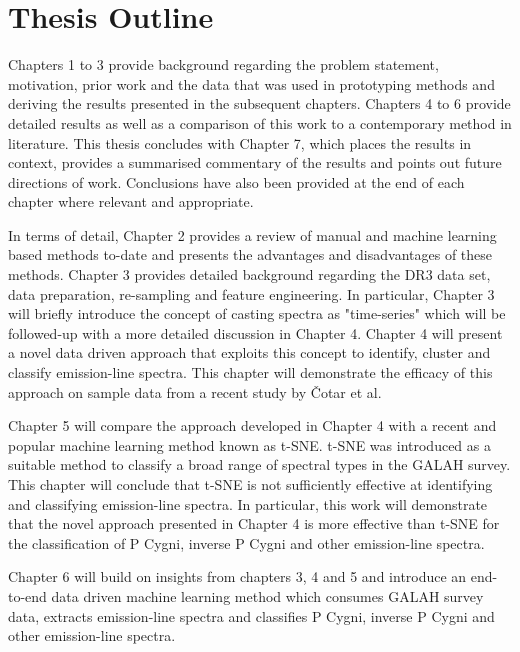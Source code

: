 \section{Thesis Outline}

Chapters 1 to 3 provide background regarding the problem statement, motivation, prior work and the data that was used in prototyping methods and deriving the results presented in the subsequent chapters. Chapters 4 to 6 provide detailed results as well as a comparison of this work to a contemporary method in literature. This thesis concludes with Chapter 7, which places the results in context, provides a summarised commentary of the results and points out future directions of work. Conclusions have also been provided at the end of each chapter where relevant and appropriate. 

In terms of detail, Chapter 2 provides a review of manual and machine learning based methods to-date and presents the advantages and disadvantages of these methods. Chapter 3 provides detailed background regarding the DR3 data set, data preparation, re-sampling and feature engineering. In particular, Chapter 3 will briefly introduce the concept of casting spectra as "time-series" which will be followed-up with a more detailed discussion in Chapter 4. Chapter 4 will present a novel data driven approach that exploits this concept to identify, cluster and classify emission-line spectra. This chapter will demonstrate the efficacy of this approach on sample data from a recent study by Čotar et al\cite{vcotar2021galah}. 

Chapter 5 will compare the approach developed in Chapter 4 with a recent and popular machine learning method known as t-SNE. t-SNE was introduced as a suitable method to classify a broad range of spectral types in the GALAH survey. This chapter will conclude that t-SNE is not sufficiently effective at identifying and classifying emission-line spectra. In particular, this work will demonstrate that the novel approach presented in Chapter 4 is more effective than t-SNE for the classification of P Cygni, inverse P Cygni and other emission-line spectra.

Chapter 6 will build on insights from chapters 3, 4 and 5 and introduce an end-to-end data driven machine learning method which consumes GALAH survey data, extracts emission-line spectra and classifies P Cygni, inverse P Cygni and other emission-line spectra. 

